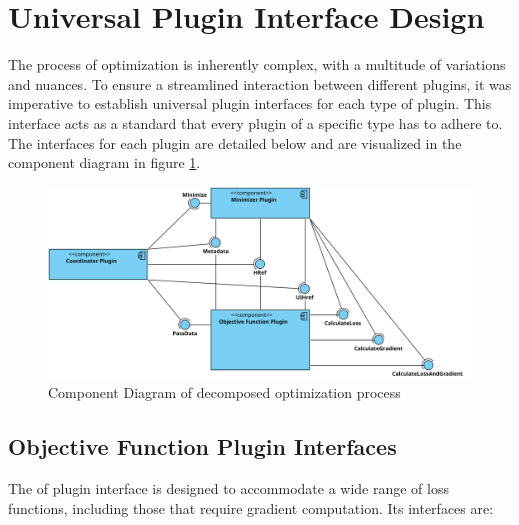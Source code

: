 \documentclass[
  a4paper,  %
  twoside,  %
  bibliography=totoc,
  headsepline,
  cleardoublepage=empty,
  parskip=half,
  draft=false
]{scrbook}
\begin{document}
\section{Universal Plugin Interface Design}

The process of optimization is inherently complex, with a multitude of variations and nuances.
To ensure a streamlined interaction between different plugins, it was imperative to establish universal plugin interfaces for each type of plugin.
This interface acts as a standard that every plugin of a specific type has to adhere to.
The interfaces for each plugin are detailed below and are visualized in the component diagram in figure \ref{fig:component_diagram}.

\begin{figure}[ht]
    \centering
    \includegraphics[width=\textwidth]{graphics/plugin_decomposition.svg}
    \caption{Component Diagram of decomposed optimization process}
    \label{fig:component_diagram}
\end{figure}

\subsection{Objective Function Plugin Interfaces}

The \gls{of} plugin interface is designed to accommodate a wide range of loss functions, including those that require gradient computation.
Its interfaces are:
\end{document}
